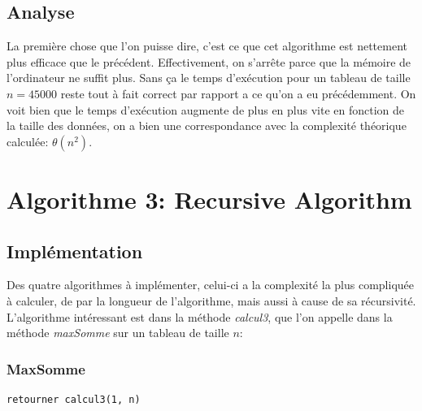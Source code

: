 \documentclass[a4paper, 12pt]{article}
\begin{document}
\subsection{Analyse}
La première chose que l'on puisse dire, c'est ce que cet algorithme est nettement plus efficace que le précédent. Effectivement, on s'arrête parce que la mémoire de l'ordinateur ne suffit plus. Sans ça le temps d’exécution pour un tableau de taille $n=45000$ reste tout à fait correct par rapport a ce qu'on a eu précédemment. On voit bien que le temps d’exécution augmente de plus en plus vite en fonction de la taille des données, on a bien une correspondance avec la complexité théorique calculée: $\theta(n^2)$.


\section{Algorithme 3: Recursive Algorithm}
\subsection{Implémentation}
Des quatre algorithmes à implémenter, celui-ci a la complexité la plus compliquée à calculer, de par la longueur de l'algorithme, mais aussi à cause de sa récursivité. L'algorithme intéressant est dans la méthode \emph{calcul3}, que l'on appelle dans la méthode \emph{maxSomme} sur un tableau de taille $n$:
\subsubsection{MaxSomme}
\begin{verbatim}
retourner calcul3(1, n)
\end{verbatim}
\end{document}
